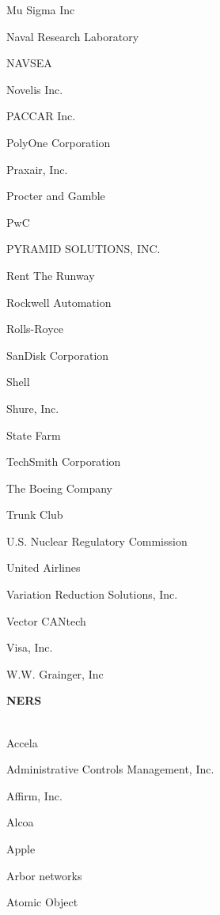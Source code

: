 \documentclass[twoside]{article}
\begin{document}
\begin{center}
\begin{multicols}{5}
\begin{FlushLeft}
\begin{compactitem}
\item Mu Sigma Inc
\item Naval Research Laboratory
\item NAVSEA
\item Novelis Inc.
\item PACCAR Inc.
\item PolyOne Corporation
\item Praxair, Inc.
\item Procter and Gamble
\item PwC
\item PYRAMID SOLUTIONS, INC.
\item Rent The Runway
\item Rockwell Automation
\item Rolls-Royce
\item SanDisk Corporation
\item Shell
\item Shure, Inc.
\item State Farm
\item TechSmith Corporation
\item The Boeing Company
\item Trunk Club
\item U.S. Nuclear Regulatory Commission
\item United Airlines
\item Variation Reduction Solutions, Inc.
\item Vector CANtech
\item Visa, Inc.
\item W.W. Grainger, Inc
\end{compactitem}
        \end{FlushLeft}
        \vspace{1em}
        {\fontsize{14}{16}\selectfont \bf NERS}\\
        \vspace{-1em}
        ~\hrulefill~
        \vspace{-.9em}
        \begin{FlushLeft}
        \begin{compactitem}
        \item Accela
\item Administrative Controls Management, Inc.
\item Affirm, Inc.
\item Alcoa
\item Apple
\item Arbor networks
\item Atomic Object

\end{compactitem}
\end{FlushLeft}
\end{multicols}
\end{center}
\end{document}
